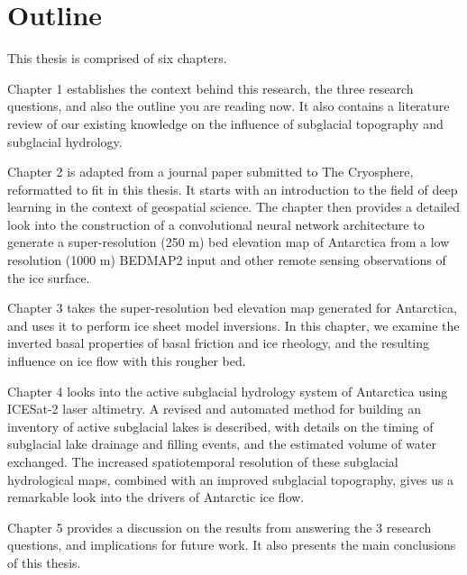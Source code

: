 \section{Outline}

This thesis is comprised of six chapters.

Chapter 1 establishes the context behind this research, the three research questions, and also the outline you are reading now.
It also contains a literature review of our existing knowledge on the influence of subglacial topography and subglacial hydrology.

Chapter 2 is adapted from a journal paper submitted to The Cryosphere, reformatted to fit in this thesis.
It starts with an introduction to the field of deep learning in the context of geospatial science.
The chapter then provides a detailed look into the construction of a convolutional neural network architecture to generate a super-resolution (250 m) bed elevation map of Antarctica from a low resolution (1000 m) BEDMAP2 input and other remote sensing observations of the ice surface.

Chapter 3 takes the super-resolution bed elevation map generated for Antarctica, and uses it to perform ice sheet model inversions.
In this chapter, we examine the inverted basal properties of basal friction and ice rheology, and the resulting influence on ice flow with this rougher bed.

Chapter 4 looks into the active subglacial hydrology system of Antarctica using ICESat-2 laser altimetry.
A revised and automated method for building an inventory of active subglacial lakes is described, with details on the timing of subglacial lake drainage and filling events, and the estimated volume of water exchanged.
The increased spatiotemporal resolution of these subglacial hydrological maps, combined with an improved subglacial topography, gives us a remarkable look into the drivers of Antarctic ice flow.

Chapter 5 provides a discussion on the results from answering the 3 research questions, and implications for future work.
It also presents the main conclusions of this thesis.
